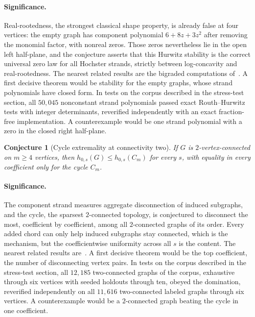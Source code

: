 \documentclass[11pt]{article}
\newtheorem{conjecture}{Conjecture}
\theoremstyle{definition}
\begin{document}
\paragraph{Significance.}
Real-rootedness, the strongest classical shape property, is already false at four vertices: the empty graph has component polynomial $6+8z+3z^2$ after removing the monomial factor, with nonreal zeros.  Those zeros nevertheless lie in the open left half-plane, and the conjecture asserts that this Hurwitz stability is the correct universal zero law for all Hochster strands, strictly between log-concavity and real-rootedness.  The nearest related results are the bigraded computations of~\cite{BP15}.  A first decisive theorem would be stability for the empty graphs, whose strand polynomials have closed form.  In tests on the corpus described in the stress-test section, all $50{,}045$ nonconstant strand polynomials passed exact Routh--Hurwitz tests with integer determinants, reverified independently with an exact fraction-free implementation.  A counterexample would be one strand polynomial with a zero in the closed right half-plane.

\begin{conjecture}[Cycle extremality at connectivity two]\label{x14}
If $G$ is $2$-vertex-connected on $m\ge4$ vertices, then $h_{0,s}(G)\le h_{0,s}(C_m)$ for every $s$, with equality in every coefficient only for the cycle $C_m$.
\end{conjecture}

\paragraph{Significance.}
The component strand measures aggregate disconnection of induced subgraphs, and the cycle, the sparsest $2$-connected topology, is conjectured to disconnect the most, coefficient by coefficient, among all $2$-connected graphs of its order.  Every added chord can only help induced subgraphs stay connected, which is the mechanism, but the coefficientwise uniformity across all $s$ is the content.  The nearest related results are~\cite{Hoch77,BP15}.  A first decisive theorem would be the top coefficient, the number of disconnecting vertex pairs.  In tests on the corpus described in the stress-test section, all $12{,}185$ two-connected graphs of the corpus, exhaustive through six vertices with seeded holdouts through ten, obeyed the domination, reverified independently on all $11{,}616$ two-connected labeled graphs through six vertices.  A counterexample would be a $2$-connected graph beating the cycle in one coefficient.
\end{document}
